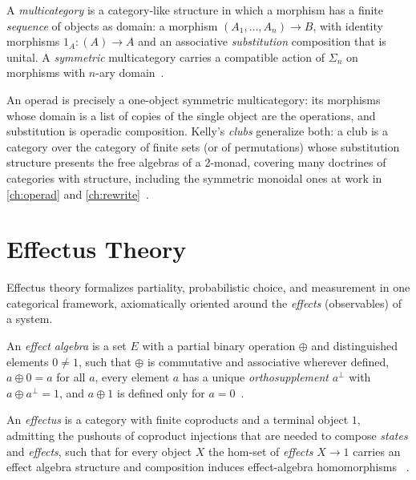 \begin{definition}[Multicategory]
A \emph{multicategory} is a category-like structure in which a morphism has a
finite \emph{sequence} of objects as domain: a morphism
$(A_1, \dots, A_n) \to B$, with identity morphisms $1_A \colon (A) \to A$ and
an associative \emph{substitution} composition that is unital. A
\emph{symmetric} multicategory carries a compatible action of $\Sigma_n$ on
morphisms with $n$-ary domain~\cite{leinster, arxiv-operads}.
\end{definition}

\begin{remark}
An operad is precisely a one-object symmetric multicategory: its morphisms
whose domain is a list of copies of the single object are the operations, and
substitution is operadic composition. Kelly's \emph{clubs} generalize both: a
club is a category over the category of finite sets (or of permutations)
whose substitution structure presents the free algebras of a 2-monad,
covering many doctrines of categories with structure, including the symmetric
monoidal ones at work in \autoref{ch:operad} and
\autoref{ch:rewrite}~\cite{kelly, leinster}.
\end{remark}

\section{Effectus Theory}\label{sec:prelim-effectus}

Effectus theory formalizes partiality, probabilistic choice, and measurement
in one categorical framework, axiomatically oriented around the
\emph{effects} (observables) of a system.

\begin{definition}
An \emph{effect algebra} is a set $E$ with a partial binary operation
$\oplus$ and distinguished elements $0 \neq 1$, such that $\oplus$ is
commutative and associative wherever defined, $a \oplus 0 = a$ for all $a$,
every element $a$ has a unique \emph{orthosupplement} $a^{\perp}$ with
$a \oplus a^{\perp} = 1$, and $a \oplus 1$ is defined only for
$a = 0$~\cite{arxiv-effectus}.
\end{definition}

\begin{definition}[Effectus]
An \emph{effectus} is a category with finite coproducts and a terminal object
$1$, admitting the pushouts of coproduct injections that are needed to
compose \emph{states} and \emph{effects}, such that for every object $X$ the
hom-set of \emph{effects} $X \to 1$ carries an effect algebra structure and
composition induces effect-algebra homomorphisms
~\cite{arxiv-effectus}.
\end{definition}

